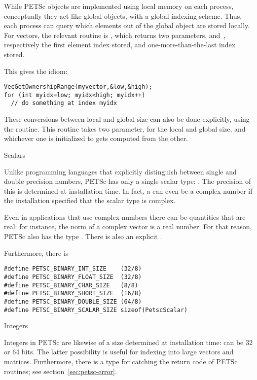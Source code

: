 
While PETSc objects are implemented using local memory on each
process, conceptually they act like global objects, with a global
indexing scheme. Thus, each process can query which elements out of
the global object are stored locally.
For vectors, the relevant routine is ,
which returns two parameters,  and~,
respectively the first element index stored, and
one-more-than-the-last index stored.

This gives the idiom:
\begin{lstlisting}
VecGetOwnershipRange(myvector,&low,&high);
for (int myidx=low; myidx<high; myidx++)
  // do something at index myidx
\end{lstlisting}

These conversions between local and global size can also be done
explicitly, using the  routine.
This routine takes two parameter, for the local and global size, and
whichever one is initialized to  gets
computed from the other.

 {Scalars}
\label{sec:petsc-scalar}

Unlike programming languages that explicitly distinguish between
single and double precision numbers, PETSc has only a single scalar
type: . The precision of this is determined
at installation time. In fact, a  can even be a
complex number if the installation specified that the scalar type is
complex.

Even in applications that use complex numbers there can be quantities
that are real: for instance, the norm of a complex vector is a real
number. For that reason, PETSc also has the type
. There is also an explicit .

Furthermore, there is
\begin{lstlisting}
#define PETSC_BINARY_INT_SIZE    (32/8)
#define PETSC_BINARY_FLOAT_SIZE  (32/8)
#define PETSC_BINARY_CHAR_SIZE   (8/8)
#define PETSC_BINARY_SHORT_SIZE  (16/8)
#define PETSC_BINARY_DOUBLE_SIZE (64/8)
#define PETSC_BINARY_SCALAR_SIZE sizeof(PetscScalar)  
\end{lstlisting}

 {Integers}

Integers in PETSc are likewise of a size determined at installation
time:  can be 32 or 64 bits.
The latter possibility is useful for indexing into large vectors and matrices.
Furthermore,
there is a  type for catching the return
code of PETSc routines; see section~\ref{sec:petsc-error}.

